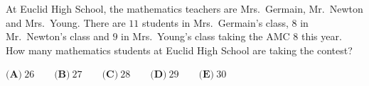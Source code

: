 At Euclid High School, the mathematics teachers are Mrs.\ Germain, Mr.\ Newton and Mrs.\ Young. There are $11$ students in Mrs.\ Germain's class, $8$ in Mr.\ Newton's class and $9$ in Mrs.\ Young's class taking the AMC 8 this year. How many mathematics students at Euclid High School are taking the contest?

$\textbf{(A)}\ 26\qquad\textbf{(B)}\ 27\qquad\textbf{(C)}\ 28\qquad\textbf{(D)}\ 29\qquad\textbf{(E)}\ 30$
